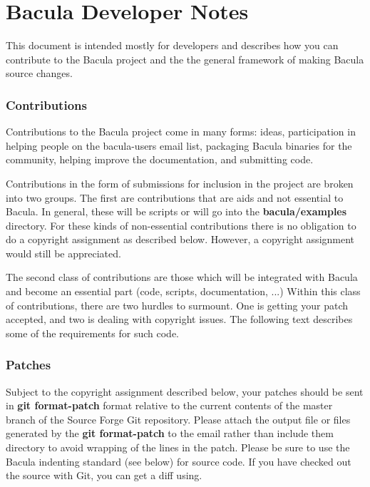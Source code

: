 
\chapter{Bacula Developer Notes}
\label{_ChapterStart10}

This document is intended mostly for developers and describes how you can
contribute to the Bacula project and the the general framework of making
Bacula source changes.

\subsection{Contributions}

Contributions to the Bacula project come in many forms: ideas,
participation in helping people on the bacula-users email list, packaging
Bacula binaries for the community, helping improve the documentation, and
submitting code.

Contributions in the form of submissions for inclusion in the project are
broken into two groups.  The first are contributions that are aids and not
essential to Bacula.  In general, these will be scripts or will go into the
{\bf bacula/examples} directory.  For these kinds of non-essential
contributions there is no obligation to do a copyright assignment as
described below.  However, a copyright assignment would still be
appreciated.

The second class of contributions are those which will be integrated with
Bacula and become an essential part (code, scripts, documentation, ...)
Within this class of contributions, there are two hurdles to surmount.  One
is getting your patch accepted, and two is dealing with copyright issues.
The following text describes some of the requirements for such code.

\subsection{Patches}

Subject to the copyright assignment described below, your patches should be
sent in {\bf git format-patch} format relative to the current contents of the 
master branch of the Source Forge Git repository.  Please attach the
output file or files generated by the {\bf git format-patch} to the email
rather than include them directory to avoid wrapping of the lines
in the patch.  Please be sure to use the Bacula
indenting standard (see below) for source code.  If you have checked out
the source with Git, you can get a diff using.

